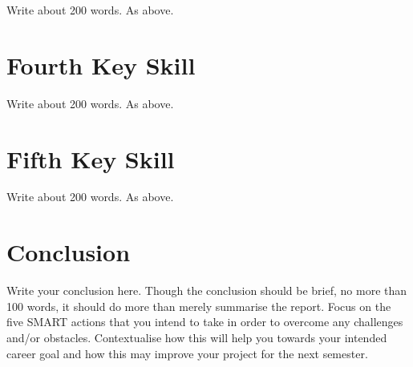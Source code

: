 \documentclass{scrartcl}
\begin{document}
Write about 200 words. As above.

\section{Fourth Key Skill}

Write about 200 words. As above.

\section{Fifth Key Skill}

Write about 200 words. As above.

\section{Conclusion}

Write your conclusion here. Though the conclusion should be brief, no more than 100 words, it should do more than merely summarise the report. Focus on the five SMART actions that you intend to take in order to overcome any challenges and/or obstacles. Contextualise how this will help you towards your intended career goal and how this may improve your project for the next semester.



\end{document}
